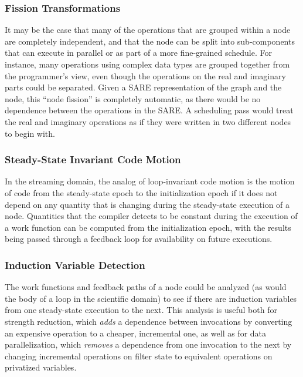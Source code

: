 \subsubsection{Fission Transformations}

It may be the case that many of the operations that are grouped within
a node are completely independent, and that the node can be split into
sub-components that can execute in parallel or as part of a more
\clearpage \noindent fine-grained schedule.  For instance, many
operations using complex data types are grouped together from the
programmer's view, even though the operations on the real and
imaginary parts could be separated.  Given a SARE representation of
the graph and the node, this ``node fission'' is completely automatic,
as there would be no dependence between the operations in the SARE.  A
scheduling pass would treat the real and imaginary operations as if
they were written in two different nodes to begin with.

\subsubsection{Steady-State Invariant Code Motion}

In the streaming domain, the analog of loop-invariant code motion is
the motion of code from the steady-state epoch to the initialization
epoch if it does not depend on any quantity that is changing during
the steady-state execution of a node.  Quantities that the compiler
detects to be constant during the execution of a work function can be
computed from the initialization epoch, with the results being passed
through a feedback loop for availability on future executions.

\subsubsection{Induction Variable Detection}

The work functions and feedback paths of a node could be analyzed (as
would the body of a loop in the scientific domain) to see if there are
induction variables from one steady-state execution to the next.  This
analysis is useful both for strength reduction, which {\it adds} a
dependence between invocations by converting an expensive operation to
a cheaper, incremental one, as well as for data parallelization, which
{\it removes} a dependence from one invocation to the next by changing
incremental operations on filter state to equivalent operations on
privatized variables.

